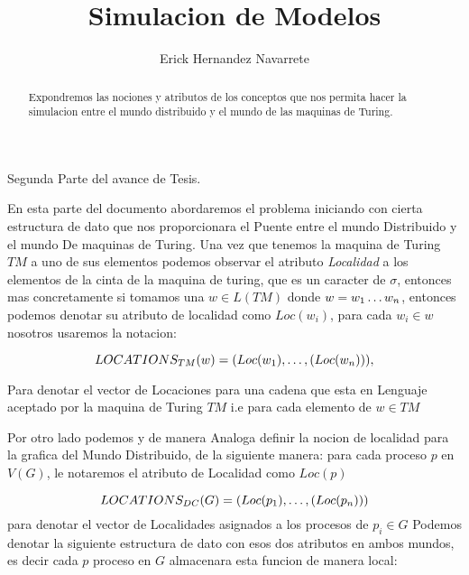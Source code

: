 \documentclass[11pt]{article}
\author{Erick Hernandez Navarrete}
\title{Simulacion de Modelos}
\begin{document}
    \begin{titlepage}
        \begin{Large}
            Segunda Parte del avance de Tesis.
        \end{Large}
    \end{titlepage}

    \begin{abstract}
        Expondremos las nociones y atributos de los conceptos que nos permita
        hacer la simulacion entre el mundo distribuido y el mundo de las maquinas
        de Turing.
    \end{abstract}
    \space
    En esta parte del documento abordaremos el problema iniciando
    con cierta estructura de dato que nos proporcionara el Puente
    entre el mundo Distribuido y el mundo De maquinas de Turing.
    \space
    Una vez que tenemos la maquina de Turing $TM$ a uno de sus elementos
    podemos observar el atributo \emph{Localidad} a los elementos de la cinta
    de la maquina de turing, que es un caracter de $\sigma$, entonces mas concretamente
    si tomamos una $w \in L(TM)$ donde $ w = w_{1} \mathellipsis w_{n}$, entonces podemos
    denotar su atributo de localidad como $Loc(w_{i})$, para cada $w_{i}\in w$
    nosotros usaremos la notacion:


    \begin{equation}
        LOCATIONS_{TM}(w) = (Loc(w_{1}),\mathellipsis, (Loc(w_{n}))),
    \end{equation}

    Para denotar el vector de Locaciones para una cadena que esta en Lenguaje
    aceptado por la maquina de Turing $TM$
    i.e para cada elemento de $w \in TM$

    \space
    Por otro lado podemos y de manera Analoga  definir la nocion de localidad
    para la grafica del Mundo Distribuido, de la siguiente manera: para cada proceso $p$ en $V(G)$,
    le notaremos el atributo de Localidad como $Loc(p)$

    \begin{equation}
        LOCATIONS_{DC}(G) = (Loc(p_{1}), \mathellipsis,(Loc(p_{n})))
    \end{equation}
    para denotar el vector de Localidades asignados a los procesos de $p_{i} \in G$ \newline
    Podemos denotar la siguiente estructura de dato con esos dos atributos en ambos mundos,
    es decir cada $p$ proceso en $G$ almacenara esta funcion de manera local:
\end{document}
